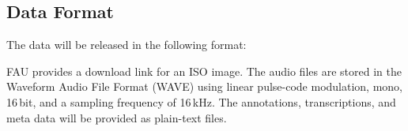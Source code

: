 \documentclass[11pt]{article}
\begin{document}
\begin{Form}
  \section*{Data Format}

  The data will be released in the following format:

  FAU provides a download link for an ISO image.
  The audio files are stored in the Waveform Audio File Format (WAVE) using linear pulse-code modulation, mono, 16\,bit, and a sampling frequency of 16\,kHz.
  The annotations, transcriptions, and meta data will be provided as plain-text files.
  



  \end{Form}
\end{document}
